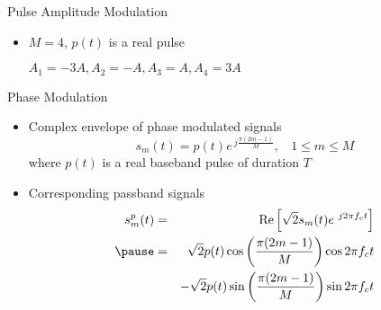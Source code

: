 \documentclass[t]{beamer}
\renewcommand\Re{\operatorname{Re}}
\begin{document}
\begin{frame}{Pulse Amplitude Modulation}
  \footnotesize
  \begin{itemize}
    \item {} $M = 4$, $p(t)$ is a real pulse

$A_1 =-3A, A_2 =-A, A_3 = A, A_4 = 3A$ 
    \pause
    \begin{figure}
      \centering
    \end{figure}
  \end{itemize}
  \normalsize
\end{frame}

\begin{frame}{Phase Modulation}
  \footnotesize
  \begin{itemize}
    \item Complex envelope of phase modulated signals
      \begin{equation*}
        s_m(t) = p(t)e^{\ j\frac{\pi(2m-1)}{M}}, \ \ \ \ 1 \leq m \leq M
      \end{equation*}
      where $p(t)$ is a real baseband pulse of duration $T$
    \pause
    \item Corresponding passband signals
      \begin{eqnarray*}
        s_m^p(t) & = & \Re\left[\sqrt{2}s_m(t)e^{\ j2\pi f_c t}\right] \\
                 \pause
                 & = & \sqrt{2}p(t)\cos \left(\frac{\pi(2m-1)}{M}\right) \cos 2\pi f_c t \\
                 &   & - \sqrt{2}p(t)\sin \left(\frac{\pi(2m-1)}{M}\right) \sin 2\pi f_c t 
      \end{eqnarray*}
  \end{itemize}
  \normalsize
\end{frame}
\end{document}
